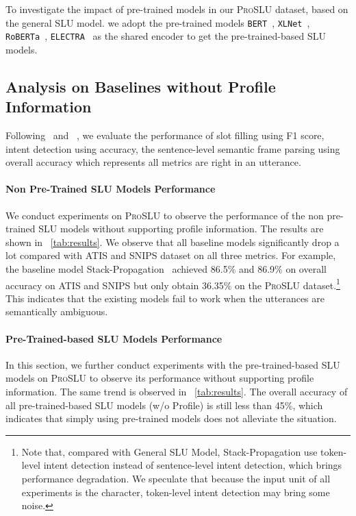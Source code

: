 \documentclass[letterpaper]{article} \usepackage{aaai22}  \usepackage{times}  \usepackage{helvet}  \usepackage{courier}  \usepackage[hyphens]{url}  \usepackage{graphicx} \urlstyle{rm} \def\UrlFont{\rm}  \usepackage{natbib}  \usepackage{caption} \DeclareCaptionStyle{ruled}{labelfont=normalfont,labelsep=colon,strut=off} \frenchspacing  \setlength{\pdfpagewidth}{8.5in}  \setlength{\pdfpageheight}{11in}  \usepackage{algorithm}
\begin{document}
To investigate the impact of pre-trained models in our \textsc{ProSLU} dataset, based on the general SLU model.
we adopt the pre-trained models \texttt{BERT}~\citep{devlin-etal-2019-bert}, \texttt{XLNet}~\citep{yang2019xlnet}, \texttt{RoBERTa}~\citep{liu2019roberta}, \texttt{ELECTRA}~\citep{clark2020electra} as the shared encoder to get the pre-trained-based SLU models.

\subsection{Analysis on Baselines without Profile Information}
Following~\citet{goo-etal-2018-slot} and ~\citet{qin-etal-2019-stack}, we evaluate the performance of slot filling using F1 score, intent detection using accuracy, the sentence-level semantic frame parsing using overall accuracy which represents all metrics are right in an utterance.
\paragraph{Non Pre-Trained SLU Models Performance}
We conduct experiments on \textsc{ProSLU} to observe the performance of the non pre-trained SLU models without supporting profile information.
The results are shown in \tablename~\ref{tab:results}. 
We observe that all baseline models significantly drop a lot compared with ATIS and SNIPS dataset on all three metrics.
For example, the baseline model Stack-Propagation~\citep{qin-etal-2019-stack} achieved 86.5\% and 86.9\% on overall accuracy on ATIS and SNIPS but only obtain 36.35\% on the \textsc{ProSLU} dataset.\footnote{Note that, compared with General SLU Model, Stack-Propagation use token-level intent detection instead of sentence-level intent detection, which brings performance degradation. We speculate that because the input unit of all experiments is the character, token-level intent detection may bring some noise.}
This indicates that the existing models fail to work when the utterances are semantically ambiguous. 

\paragraph{Pre-Trained-based SLU Models Performance}
In this section, we further conduct experiments with the pre-trained-based SLU models on \textsc{ProSLU} to observe its performance without supporting profile information.
The same trend is observed in \tablename~\ref{tab:results}. 
The overall accuracy of all pre-trained-based SLU models (w/o Profile) is still less than 45\%, which indicates that simply using pre-trained models does not alleviate the situation.
\end{document}
